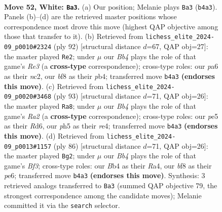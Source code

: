 \documentclass[11pt]{article}
\begin{document}
\clearpage

\begin{figure}[p]\centering
\begin{subfigure}{0.46\textwidth}\centering
\resizebox{\linewidth}{!}{%
\newchessgame
\chessboard[
  setfen={3r1b2/7p/p2pn3/P3p1kp/1BP1P3/1P3P1R/3K2B1/8 w - - 0 52},
  showmover=false,
  pgfstyle=straightmove, color=movearrow, markmove={b4-a3}
]}
\caption{}
\end{subfigure}\hfill
\begin{subfigure}{0.46\textwidth}\centering
\resizebox{\linewidth}{!}{%
\newchessgame
\chessboard[
  setfen={4k3/6b1/6p1/2BBp2p/1pP4P/1P2R1P1/2n3K1/8 w - - 1 47},
  showmover=false,
  pgfstyle=straightmove, color=movearrow, markmove={e3-e2}
]}
\caption{}
\end{subfigure}
\\[4pt]
\begin{subfigure}{0.46\textwidth}\centering
\resizebox{\linewidth}{!}{%
\newchessgame
\chessboard[
  setfen={4b3/rp3pk1/3r4/P7/4Rp2/1N2bPpP/1P4P1/R4B1K b - - 5 47},
  showmover=false,
  pgfstyle=straightmove, color=movearrow, markmove={a7-a8}
]}
\caption{}
\end{subfigure}\hfill
\begin{subfigure}{0.46\textwidth}\centering
\resizebox{\linewidth}{!}{%
\newchessgame
\chessboard[
  setfen={r7/5p2/3np3/p2p3P/R1pP1k2/2P2B2/2P2P2/3K4 w - - 11 44},
  showmover=false,
  pgfstyle=straightmove, color=movearrow, markmove={f3-g2}
]}
\caption{}
\end{subfigure}
\caption{\textbf{Move 52, White: \texttt{Ba3}.} (a) Our position; Melanie plays \texttt{Ba3} (\texttt{b4a3}). Panels (b)--(d) are the retrieved master positions whose correspondence most drove this move (highest QAP objective among those that transfer to it). (b) Retrieved from \texttt{lichess\_elite\_2024-09\_p0010\#2324} (ply 92) [structural distance $d$=67, QAP obj=27]: the master played \texttt{Re2}; under $\mu$ our \emph{Bb4} plays the role of that game's \emph{Re3} (a \textbf{cross-type} correspondence); cross-type roles: our \emph{p}a6 as their \emph{n}c2, our \emph{b}f8 as their \emph{p}b4; transferred move \texttt{b4a3} \textbf{(endorses this move)}. (c) Retrieved from \texttt{lichess\_elite\_2024-09\_p0020\#3468} (ply 93) [structural distance $d$=71, QAP obj=26]: the master played \texttt{Ra8}; under $\mu$ our \emph{Bb4} plays the role of that game's \emph{Ra2} (a \textbf{cross-type} correspondence); cross-type roles: our \emph{p}e5 as their \emph{R}d6, our \emph{p}h5 as their \emph{r}e4; transferred move \texttt{b4a3} \textbf{(endorses this move)}. (d) Retrieved from \texttt{lichess\_elite\_2024-09\_p0013\#1157} (ply 86) [structural distance $d$=71, QAP obj=26]: the master played \texttt{Bg2}; under $\mu$ our \emph{Bb4} plays the role of that game's \emph{Bf3}; cross-type roles: our \emph{B}b4 as their \emph{R}a4, our \emph{b}f8 as their \emph{p}e6; transferred move \texttt{b4a3} \textbf{(endorses this move)}. Synthesis: 3 retrieved analogs transferred to \texttt{Ba3} (summed QAP objective 79, the strongest correspondence among the candidate moves); Melanie committed it via the \texttt{search} selector.}
\label{fig:thought-m102}
\end{figure}
\end{document}
